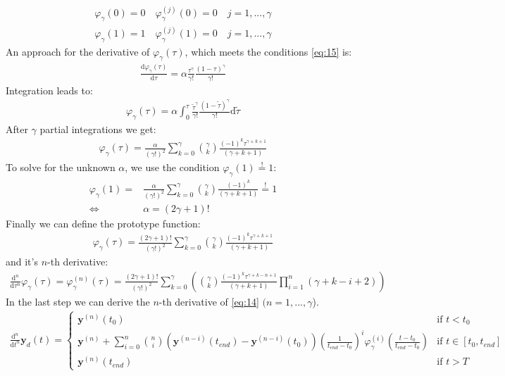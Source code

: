 \documentclass[a4paper,11pt,headings=standardclasses]{scrartcl}%
\renewcommand{\d}{\mathrm{d}} %
\newcommand{\py}{\emph{Python}\,}
\begin{document}
\begin{subequations}
\label{eq:15}
\begin{align}
\varphi_\gamma(0)=0 \quad \varphi^{(j)}_\gamma(0)=0 \quad j = 1,...,\gamma \\
\varphi_\gamma(1)=1 \quad \varphi^{(j)}_\gamma(1)=0 \quad j = 1,...,\gamma 
\end{align}
\end{subequations}
An approach for the derivative of $\varphi_\gamma(\tau)$, which meets the conditions \eqref{eq:15} is:
\begin{align}
\frac{\d \varphi_\gamma(\tau)}{\d \tau} = \alpha \frac{\tau^{\gamma}}{\gamma!}\frac{(1-\tau)^{\gamma}}{\gamma!}
\end{align}
Integration leads to:
\begin{align}
\varphi_\gamma(\tau) = \alpha \int_0^\tau\frac{\tilde{\tau}^{\gamma}}{\gamma!}\frac{(1-\tilde{\tau})^{\gamma}}{\gamma!} \d \tilde{\tau}
\end{align}
After $\gamma$ partial integrations we get:
\begin{align*}
\varphi_\gamma(\tau)= \frac{\alpha}{(\gamma!)^2} \sum_{k=0}^{\gamma} \binom{\gamma}{k} \frac{(-1)^k\tau^{\gamma+k+1}}{(\gamma+k+1)}
\end{align*}
To solve for the unknown $\alpha$, we use the condition $\varphi_\gamma(1)\overset{!}{=}1$:
\begin{align*}
\varphi_\gamma(1)= &\frac{\alpha}{(\gamma!)^2} \sum_{k=0}^{\gamma} \binom{\gamma}{k} \frac{(-1)^k}{(\gamma+k+1)} \overset{!}{=} 1 \\
\Leftrightarrow \quad & \alpha = (2\gamma+1)!
\end{align*}
Finally we can define the prototype function:
\begin{align}
\varphi_\gamma(\tau)= \frac{(2\gamma+1)!}{(\gamma!)^2} \sum_{k=0}^{\gamma} \binom{\gamma}{k} \frac{(-1)^k\tau^{\gamma+k+1}}{(\gamma+k+1)}
\end{align}
and it's $n$-th derivative:
\begin{align}
\frac{\d^n }{\d \tau^n}\varphi_\gamma(\tau)=\varphi_\gamma^{(n)}(\tau)= \frac{(2\gamma+1)!}{(\gamma!)^2} \sum_{k=0}^{\gamma} \left(\binom{\gamma}{k} \frac{(-1)^k\tau^{\gamma+k-n+1}}{(\gamma+k+1)}\prod_{i=1}^n(\gamma+k-i+2)\right)
\end{align}
In the last step we can derive the $n$-th derivative of \eqref{eq:14} $(n=1,...,\gamma$).
\begin{align}
\frac{\d^n}{\d t^n}\mathbf{y}_d(t) = \begin{cases} \mathbf{y}^{(n)}(t_0) & \textrm{if } t<t_0 \\ \mathbf{y}^{(n)} + \sum_{i=0}^{n}\binom{n}{i}(\mathbf{y}^{(n-i)}(t_{end})-\mathbf{y}^{(n-i)}(t_0))\left(\frac{1}{t_{end}-t_0}\right)^i\varphi_\gamma^{(i)}\left(\frac{t-t_0}{t_{end}-t_0}\right) &\textrm{if } t \in [t_0, t_{end}] \\ \mathbf{y}^{(n)}(t_{end})&\textrm{if } t>T\end{cases}
\end{align}
\end{document}
